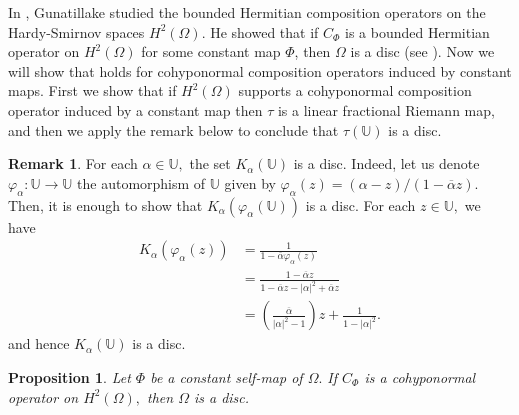 \documentclass[11pt]{amsart}%
\newtheorem{pps}[thm]{Proposition}
\theoremstyle{definition}
\newtheorem{rem}[thm]{Remark}
\theoremstyle{remark}
\numberwithin{equation}{section}
\begin{document}
In \cite{Gajath}, Gunatillake studied the bounded Hermitian composition
operators on the Hardy-Smirnov spaces $H^{2}(\Omega).$ He showed that if
$C_{\Phi}$ is a bounded Hermitian operator on $H^{2}(\Omega)$ for some
constant map $\Phi$, then $\Omega$ is a disc (see \cite[Lemma 3.1]{Gajath}).
Now we will show that \cite[Lemma 3.1]{Gajath} holds for cohyponormal
composition operators induced by constant maps.
First we show that if $H^{2}(\Omega)$ supports a cohyponormal composition
operator induced by a constant map then $\tau$ is a linear fractional Riemann
map, and then we apply the remark below to conclude that $\tau(\mathbb{U})$ is
a disc.

\begin{rem}
\label{080} For each $\alpha\in\mathbb{U},$ the set $K_{\alpha}(\mathbb{U})$
is a disc. Indeed, let us denote $\varphi_{\alpha}:\mathbb{U}\longrightarrow
\mathbb{U}$ the automorphism of $\mathbb{U}$ given by $\varphi_{\alpha
}(z)=(\alpha-z)/(1-\overline{\alpha}z).$ Then, it is enough to show that
$K_{\alpha}(\varphi_{\alpha}(\mathbb{U}))$ is a disc. For each $z\in
\mathbb{U},$ we have
\begin{align*}
K_{\alpha}(\varphi_{\alpha}(z))  &  =\frac{1}{1-\overline{\alpha}%
\varphi_{\alpha}(z)}\\
&  =\frac{1-\overline{\alpha}z}{1-\overline{\alpha}z-|\alpha|^{2}%
+\overline{\alpha}z}\\
&  = \left(  \frac{\overline{\alpha}}{|\alpha|^{2}-1}\right)  z+\frac
{1}{1-|\alpha|^{2}}.
\end{align*}
and hence $K_{\alpha}(\mathbb{U})$ is a disc.
\end{rem}

\begin{pps}
\label{029} Let $\Phi$ be a constant self-map of $\Omega.$ If $C_{\Phi}$ is a
cohyponormal operator on $H^{2}(\Omega),$ then $\Omega$ is a disc.
\end{pps}
\end{document}
